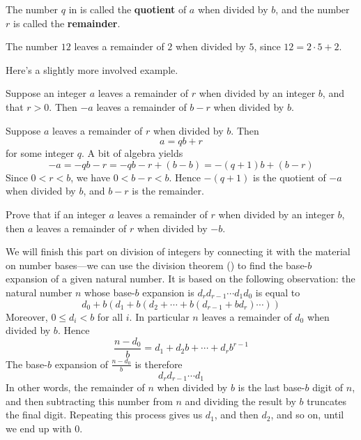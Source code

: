 The number $q$ in  is called the \textbf{quotient} of $a$ when divided by $b$, and the number $r$ is called the \textbf{remainder}.

\begin{example}
The number $12$ leaves a remainder of $2$ when divided by $5$, since $12 = 2 \cdot 5 + 2$.
\end{example}

Here's a slightly more involved example.

\begin{proposition}
Suppose an integer $a$ leaves a remainder of $r$ when divided by an integer $b$, and that $r>0$. Then $-a$ leaves a remainder of $b-r$ when divided by $b$.
\end{proposition}

\begin{cproof}
Suppose $a$ leaves a remainder of $r$ when divided by $b$. Then
\[ a=qb+r \]
for some integer $q$. A bit of algebra yields
\[ -a = -qb-r = -qb-r+(b-b) = -(q+1)b + (b-r) \]
Since $0<r<b$, we have $0<b-r<b$. Hence $-(q+1)$ is the quotient of $-a$ when divided by $b$, and $b-r$ is the remainder.
\end{cproof}

\begin{exercise}
Prove that if an integer $a$ leaves a remainder of $r$ when divided by an integer $b$, then $a$ leaves a remainder of $r$ when divided by $-b$.
\end{exercise}

We will finish this part on division of integers by connecting it with the material on number bases---we can use the division theorem () to find the base-$b$ expansion of a given natural number. It is based on the following observation: the natural number $n$ whose base-$b$ expansion is $d_rd_{r-1} \cdots d_1 d_0$ is equal to
\[ d_0 + b(d_1 + b(d_2 + \cdots + b(d_{r-1} + bd_r) \cdots)) \]
Moreover, $0 \le d_i < b$ for all $i$. In particular $n$ leaves a remainder of $d_0$ when divided by $b$. Hence
\[ \frac{n-d_0}{b} = d_1 + d_2b + \cdots + d_rb^{r-1} \]
The base-$b$ expansion of $\frac{n-d_0}{b}$ is therefore
\[ d_rd_{r-1} \cdots d_1 \]
In other words, the remainder of $n$ when divided by $b$ is the last base-$b$ digit of $n$, and then subtracting this number from $n$ and dividing the result by $b$ truncates the final digit. Repeating this process gives us $d_1$, and then $d_2$, and so on, until we end up with $0$.


